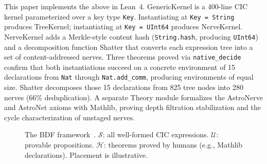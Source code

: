 This paper implements the above in Lean~4.  GenericKernel is a 400-line CIC kernel parameterized over a key type \texttt{Key}.  Instantiating at \texttt{Key = String} produces TreeKernel; instantiating at \texttt{Key = UInt64} produces NerveKernel.  NerveKernel adds a Merkle-style content hash (\texttt{String.hash}, producing \texttt{UInt64}) and a decomposition function Shatter that converts each expression tree into a set of content-addressed nerves.  Three theorems proved via \texttt{native\_decide} confirm that both instantiations succeed on a concrete environment of 15 declarations from \texttt{Nat} through \texttt{Nat.add\_comm}, producing environments of equal size.  Shatter decomposes those 15 declarations from 825 tree nodes into 280 nerves (66\% deduplication).  A separate Theory module formalizes the AstroNerve and AstroNet axioms with Mathlib, proving depth filtration stabilization and the cycle characterization of unstaged nerves.

\begin{figure}[H]
\centering
{}
\caption{The BDF framework~\cite{BDF2026}.  $\mathcal{S}$: all well-formed CIC expressions.  $\mathcal{U}$: provable propositions.  $\mathcal{H}$: theorems proved by humans (e.g., Mathlib declarations).  Placement is illustrative.}
\label{fig:bdf-framework}
\end{figure}

